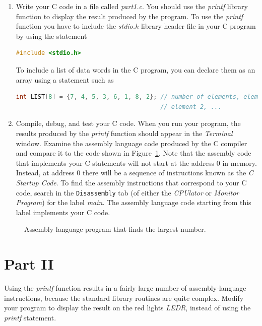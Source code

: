 \documentclass[epsfig,10pt,fullpage]{article}
\begin{document}
\begin{enumerate}
\item
Write your C code in a file called {\it part1.c}.  You should use the {\it printf}
library function to display the result produced by the program. To use the {\it printf} function 
you have to include the {\it stdio.h} library header file in your C program by using the statement

\begin{lstlisting}[language=C]
#include <stdio.h>
\end{lstlisting}

To include a list of data words in the C program, you can declare them as an array using
a statement such as

\begin{lstlisting}[language=C]
int LIST[8] = {7, 4, 5, 3, 6, 1, 8, 2}; // number of elements, element 1,
                                        // element 2, ...
\end{lstlisting}

\item
Compile, debug, and test your C code.  When you run your program, the results produced by the
{\it printf} function should appear in the {\it Terminal} window.
Examine the assembly language code produced by the C compiler and compare it to the code 
shown in Figure~\ref{fig:code}. Note that the assembly code that implements your C
statements will not start at the address 0 in memory. Instead, at address 0 there will be 
a sequence of instructions known as the {\it C Startup Code}. To find the assembly
instructions that correspond to your C code, search in the \texttt{Disassembly} tab 
(of either the {\it CPUlator} or {\it Monitor Program}) for the label {\it main}. The 
assembly language code starting from this label implements your C code. 
\end{enumerate}

\begin{figure}[H]
\begin{center}

\end{center}
\caption{Assembly-language program that finds the largest number.}
\label{fig:code}
\end{figure}

\section*{Part II}
Using the {\it printf} function results in a fairly large number of assembly-language instructions,
because the standard library routines are quite complex. Modify your program to display the 
result on the red lights {\it LEDR}, instead of using the {\it printf} statement. 
\end{document}
